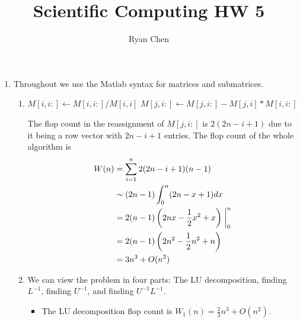 \documentclass{article}
\title{Scientific Computing HW 5}
\author{Ryan Chen}
\newcommand{\br}[1]{\left(#1\right)}
\newcommand{\inv}{^{-1}}
\begin{document}
	
\maketitle


\begin{enumerate}
	
	
	
	\item Throughout we use the Matlab syntax for matrices and submatrices.
	
	\begin{enumerate}
		
		
		
		\item 
		
		\begin{algorithmic}
				\State $M[i,i:] \gets M[i,i:]/M[i,i]$
					\State $M[j,i:] \gets M[j,i:] - M[j,i]*M[i,i:]$
				\EndFor
			\EndFor
		\end{algorithmic}
	
		The flop count in the reassignment of $M[j,i:]$ is $2(2n-i+1)$ due to it being a row vector with $2n-i+1$ entries. The flop count of the whole algorithm is
		\begin{align*}
			W(n) &= \sum_{i=1}^n 2(2n-i+1)(n-1) \\
			&\sim (2n-1)\int_0^n (2n-x+1)dx \\
			&= 2(n-1)\br{2nx-\frac12x^2+x}\eval_0^n \\
			&= 2(n-1)\br{2n^2-\frac12n^2+n} \\
			&= 3n^3 + O(n^2)
		\end{align*}
		
		
		
		\item We can view the problem in four parts: The LU decomposition, finding $L\inv$, finding $U\inv$, and finding $U\inv L\inv$.
		
		\begin{itemize}
			
			
			
			\item The LU decomposition flop count is $W_1(n) = \frac23n^3 + O(n^2)$.
			
			
			

\end{itemize}
\end{enumerate}
\end{enumerate}
\end{document}
